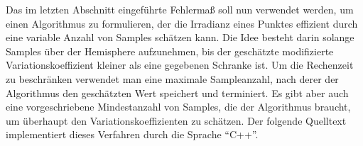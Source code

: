 		Das im letzten Abschnitt eingeführte Fehlermaß soll nun verwendet werden, um einen Algorithmus zu formulieren, der die Irradianz eines Punktes effizient durch eine variable Anzahl von Samples schätzen kann.
		Die Idee besteht darin solange Samples über der Hemisphere aufzunehmen, bis der geschätzte modifizierte Variationskoeffizient kleiner als eine gegebenen Schranke ist.
		Um die Rechenzeit zu beschränken verwendet man eine maximale Sampleanzahl, nach derer der Algorithmus den geschätzten Wert speichert und terminiert.
		Es gibt aber auch eine vorgeschriebene Mindestanzahl von Samples, die der Algorithmus braucht, um überhaupt den Variationskoeffizienten zu schätzen.
		Der folgende Quelltext implementiert dieses Verfahren durch die Sprache \enquote{C++}.

		

